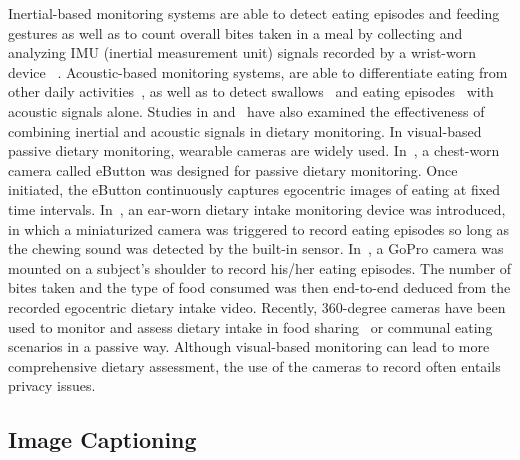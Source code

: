 \documentclass[journal]{IEEEtran}
\begin{document}
Inertial-based monitoring systems are able to detect eating episodes and feeding gestures as well as to count overall bites taken in a meal by collecting and analyzing IMU (inertial measurement unit) signals recorded by a wrist-worn device ~\cite{dong2012new,dong2013detecting,thomaz2015practical,zhang2016food,shen2016assessing,zhang2017generalized,zhang2018sense,kyritsis2019modeling,kyritsis2020data}. Acoustic-based monitoring systems, are able to differentiate eating from other daily activities~\cite{yatani2012bodyscope,rahman2014bodybeat}, as well as to detect swallows~\cite{sazonov2009automatic,olubanjo2014real} and eating episodes~\cite{bi2018auracle} with acoustic signals alone. Studies in \cite{papapanagiotou2016novel} and~\cite{bedri2017earbit} have also examined the effectiveness of combining inertial and acoustic signals in dietary monitoring. In visual-based passive dietary monitoring, wearable cameras are widely used. In~\cite{sun2015exploratory}, a chest-worn camera called eButton was designed for passive dietary monitoring. Once initiated, the eButton continuously captures egocentric images of eating at fixed time intervals. In~\cite{liu2012intelligent}, an ear-worn dietary intake monitoring device was introduced, in which a miniaturized camera was triggered to record eating episodes so long as the chewing sound was detected by the built-in sensor. In~\cite{qiu2020counting}, a GoPro camera was mounted on a subject's shoulder to record his/her eating episodes. The number of bites taken and the type of food consumed was then end-to-end deduced from the recorded egocentric dietary intake video. Recently, 360-degree cameras have been used to monitor and assess dietary intake in food sharing~\cite{qiu2019assessing,Lei2020assessing} or communal eating~\cite{rouast2019learning} scenarios in a passive way. Although visual-based monitoring can lead to more comprehensive dietary assessment, the use of the cameras to record often entails privacy issues.






\subsection{Image Captioning}
\end{document}
